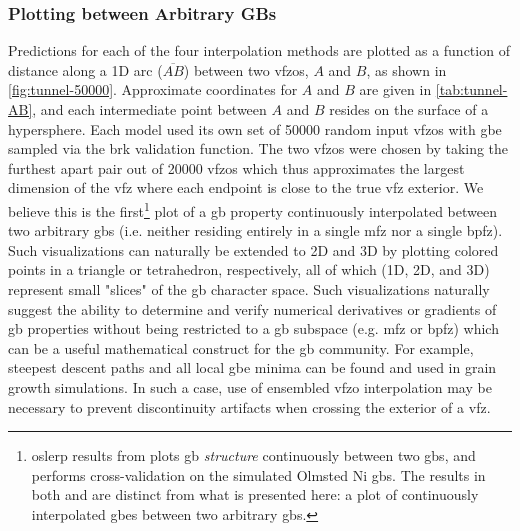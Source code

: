 \documentclass[final,twocolumn,12pt]{elsarticle}
\newcommand{\inpt}{input}
\begin{document}
\subsubsection{Plotting  between Arbitrary GBs}
Predictions for each of the four interpolation methods are plotted as a function of distance along a 1D arc ($\overline{AB}$) between two \glspl{vfzo}, $A$ and $B$, as shown in \cref{fig:tunnel-50000}. Approximate coordinates for $A$ and $B$ are given in \cref{tab:tunnel-AB}, and each intermediate point between $A$ and $B$ resides on the surface of a hypersphere. Each model used its own set of \num{50000} random \inpt{} \glspl{vfzo} with \gls{gbe} sampled via the \gls{brk} validation function. The two \glspl{vfzo} were chosen by taking the furthest apart pair out of \num{20000} \glspl{vfzo} which thus approximates the largest dimension of the \gls{vfz} where each endpoint is close to the true \gls{vfz} exterior. We believe this is the first\footnote{\Gls{oslerp} results from \cite{francisGeodesicOctonionMetric2019} plots \gls{gb} \emph{structure} continuously between two \glspl{gb}, and \cite{chesserLearningGrainBoundary2020} performs cross-validation on the simulated Olmsted Ni \glspl{gb}. The results in both \cite{francisGeodesicOctonionMetric2019} and \cite{chesserLearningGrainBoundary2020} are distinct from what is presented here: a plot of continuously interpolated \glspl{gbe} between two arbitrary \glspl{gb}.} plot of a \gls{gb} property continuously interpolated between two arbitrary \glspl{gb} (i.e. neither residing entirely in a single \gls{mfz} nor a single \gls{bpfz}). Such visualizations can naturally be extended to 2D and 3D by plotting colored points in a triangle or tetrahedron, respectively, all of which (1D, 2D, and 3D) represent small "slices" of the \gls{gb} character space. Such visualizations naturally suggest the ability to determine and verify numerical derivatives or gradients of \gls{gb} properties without being restricted to a \gls{gb} subspace (e.g. \gls{mfz} or \gls{bpfz}) which can be a useful mathematical construct for the \gls{gb} community. For example, steepest descent paths and all local \gls{gbe} minima can be found and used in grain growth simulations. In such a case, use of ensembled \gls{vfzo} interpolation may be necessary to prevent discontinuity artifacts when crossing the exterior of a \gls{vfz}.
\end{document}
